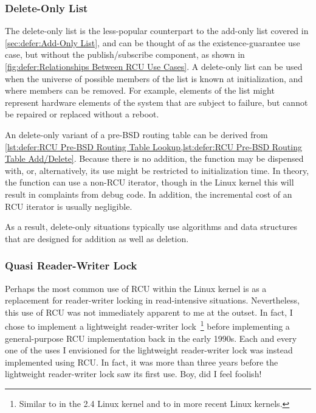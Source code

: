 \subsubsection{Delete-Only List}
\label{sec:defer:Delete-Only List}

The delete-only list is the less-popular counterpart to the add-only list
covered in \cref{sec:defer:Add-Only List}, and can be thought of as the
existence-guarantee use case, but without the publish/subscribe component,
as shown in \cref{fig:defer:Relationships Between RCU Use Cases}.
A delete-only list can be used when the universe of possible members of
the list is known at initialization, and where members can be removed.
For example, elements of the list might represent hardware elements of
the system that are subject to failure, but cannot be repaired or
replaced without a reboot.

An delete-only variant of a pre-BSD routing table can be derived from
\cref{lst:defer:RCU Pre-BSD Routing Table Lookup,lst:defer:RCU Pre-BSD Routing Table Add/Delete}.
Because there is no addition, the  function may be
dispensed with, or, alternatively, its use might be restricted to
initialization time.
In theory, the  function can use a non-RCU iterator,
though in the Linux kernel this will result in complaints from debug code.
In addition, the incremental cost of an RCU iterator is usually
negligible.

As a result, delete-only situations typically use algorithms and data
structures that are designed for addition as well as deletion.

\subsubsection{Quasi Reader-Writer Lock}
\label{sec:defer:Quasi Reader-Writer Lock}

Perhaps the most common use of RCU within the Linux kernel is as
a replacement for reader-writer locking in read-intensive situations.
Nevertheless, this use of RCU was not immediately apparent to me
at the outset.
In fact, I chose to implement a lightweight reader-writer
lock~\cite{WilsonCHsieh92a}\footnote{
	Similar to  in the 2.4 Linux kernel and to
	 in more recent Linux kernels.}
before implementing a general-purpose RCU implementation
back in the early 1990s.
Each and every one of the uses I envisioned for the lightweight reader-writer
lock was instead implemented using RCU\@.
In fact, it was more than
three years before the lightweight reader-writer lock saw its first use.
Boy, did I feel foolish!

